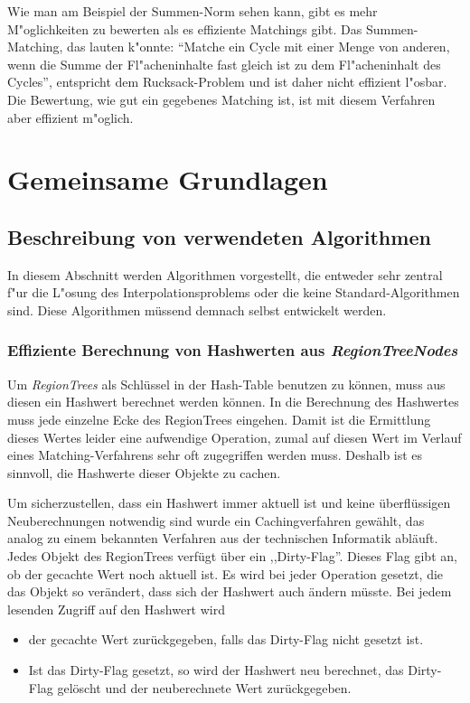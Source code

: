 Wie man am Beispiel der Summen-Norm sehen kann, gibt es mehr M"oglichkeiten zu bewerten als es effiziente Matchings gibt. Das Summen-Matching, das lauten k"onnte: "`Matche ein Cycle mit  einer Menge von anderen, wenn die Summe der Fl"acheninhalte fast gleich ist zu dem Fl"acheninhalt des Cycles"', entspricht dem Rucksack-Problem und ist daher nicht effizient l"osbar. Die Bewertung, wie gut ein gegebenes Matching ist, ist mit diesem Verfahren aber effizient m"oglich.

\section{Gemeinsame Grundlagen}

\subsection{Beschreibung von verwendeten Algorithmen} \label{Algorithmen}
In diesem Abschnitt werden Algorithmen vorgestellt, die entweder sehr zentral f"ur die L"osung des Interpolationsproblems oder die keine Standard-Algorithmen sind. Diese Algorithmen müssend demnach selbst entwickelt werden.

\subsubsection{Effiziente Berechnung von Hashwerten aus \textit{RegionTreeNodes}}\label{berechenHashwerte}

Um \textit{RegionTrees} als Schlüssel in der Hash-Table benutzen zu können, muss aus diesen ein Hashwert berechnet werden können. In die Berechnung des Hashwertes muss jede einzelne Ecke des RegionTrees eingehen. Damit ist die Ermittlung dieses Wertes leider eine aufwendige Operation, zumal auf diesen Wert im Verlauf eines Matching-Verfahrens sehr oft zugegriffen werden muss. Deshalb ist es sinnvoll, die Hashwerte dieser Objekte zu cachen. 

Um sicherzustellen, dass ein Hashwert immer aktuell ist und keine überflüssigen Neuberechnungen notwendig sind wurde ein Cachingverfahren gewählt, das analog zu einem bekannten Verfahren aus der technischen Informatik abläuft. Jedes Objekt des RegionTrees verfügt über ein ,,Dirty-Flag''. Dieses Flag gibt an, ob der gecachte Wert noch aktuell ist. Es wird bei jeder Operation gesetzt, die das Objekt so verändert, dass sich der Hashwert auch ändern müsste. Bei jedem lesenden Zugriff auf den Hashwert wird 
\begin{itemize}
\item der gecachte Wert zurückgegeben, falls das Dirty-Flag nicht gesetzt ist.
\item Ist das Dirty-Flag gesetzt, so wird der Hashwert neu berechnet, das Dirty-Flag gelöscht und der neuberechnete Wert zurückgegeben.
\end{itemize}

